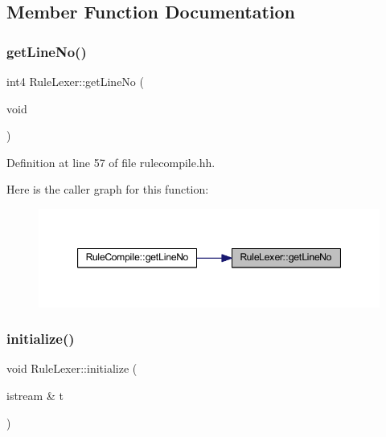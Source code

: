\subsection{Member Function Documentation}
\mbox{\label{class_rule_lexer_a5560d47807583bf7e5483a061cad1918}} 
\subsubsection{\texorpdfstring{getLineNo()}{getLineNo()}}
{\footnotesize\ttfamily int4 Rule\+Lexer\+::get\+Line\+No (\begin{DoxyParamCaption}\item[{void}]{ }\end{DoxyParamCaption})\hspace{0.3cm}{\ttfamily [inline]}}



Definition at line 57 of file rulecompile.\+hh.

Here is the caller graph for this function\+:
\nopagebreak
\begin{figure}[H]
\begin{center}
\leavevmode
\includegraphics[width=347pt]{class_rule_lexer_a5560d47807583bf7e5483a061cad1918_icgraph}
\end{center}
\end{figure}
\mbox{\label{class_rule_lexer_a8db7e5c6f395d5efaf88deb517e6d968}} 
\subsubsection{\texorpdfstring{initialize()}{initialize()}}
{\footnotesize\ttfamily void Rule\+Lexer\+::initialize (\begin{DoxyParamCaption}\item[{istream \&}]{t }\end{DoxyParamCaption})}

